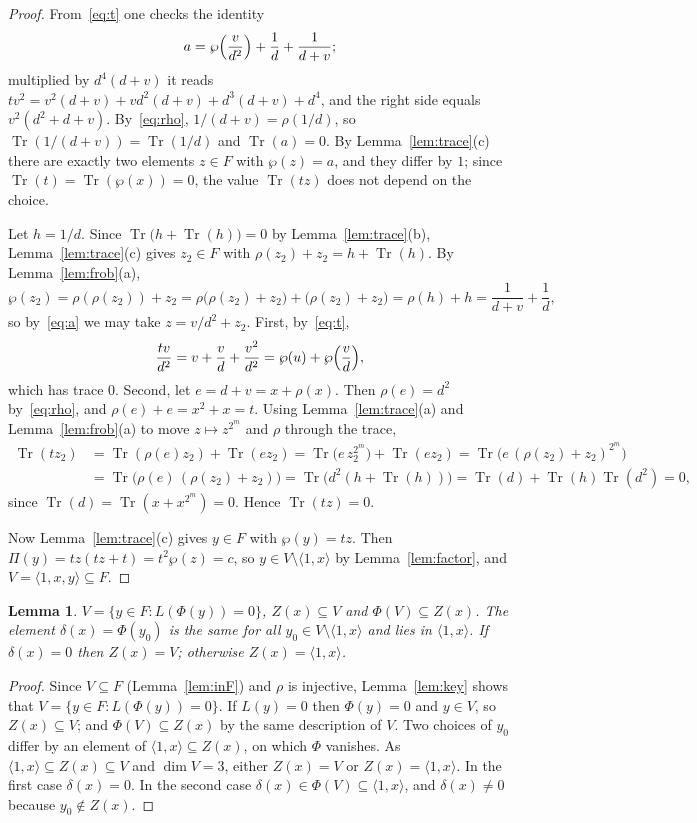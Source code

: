 \documentclass[11pt]{amsart}
\newtheorem{lemma}[theorem]{Lemma}
\theoremstyle{definition}
\theoremstyle{remark}
\numberwithin{equation}{section}
\newcommand{\Tr}{\operatorname{Tr}}
\begin{document}
\begin{proof}
From~\eqref{eq:t} one checks the identity
\begin{equation}\label{eq:a}
a=\wp\Bigl(\frac{v}{d^2}\Bigr)+\frac1d+\frac1{d+v};
\end{equation}
multiplied by $d^4(d+v)$ it reads $tv^2=v^2(d+v)+vd^2(d+v)+d^3(d+v)+d^4$, and the right side equals $v^2(d^2+d+v)$. By~\eqref{eq:rho}, $1/(d+v)=\rho(1/d)$, so $\Tr(1/(d+v))=\Tr(1/d)$ and $\Tr(a)=0$. By Lemma~\ref{lem:trace}(c) there are exactly two elements $z\in F$ with $\wp(z)=a$, and they differ by $1$; since $\Tr(t)=\Tr(\wp(x))=0$, the value $\Tr(tz)$ does not depend on the choice.

Let $h=1/d$. Since $\Tr\bigl(h+\Tr(h)\bigr)=0$ by Lemma~\ref{lem:trace}(b), Lemma~\ref{lem:trace}(c) gives $z_2\in F$ with $\rho(z_2)+z_2=h+\Tr(h)$. By Lemma~\ref{lem:frob}(a),
\[
\wp(z_2)=\rho(\rho(z_2))+z_2=\rho\bigl(\rho(z_2)+z_2\bigr)+\bigl(\rho(z_2)+z_2\bigr)=\rho(h)+h=\frac1{d+v}+\frac1d ,
\]
so by~\eqref{eq:a} we may take $z=v/d^2+z_2$. First, by~\eqref{eq:t},
\[
\frac{tv}{d^2}=v+\frac vd+\frac{v^2}{d^2}=\wp(u)+\wp\Bigl(\frac vd\Bigr),
\]
which has trace $0$. Second, let $e=d+v=x+\rho(x)$. Then $\rho(e)=d^2$ by~\eqref{eq:rho}, and $\rho(e)+e=x^2+x=t$. Using Lemma~\ref{lem:trace}(a) and Lemma~\ref{lem:frob}(a) to move $z\mapsto z^{2^m}$ and $\rho$ through the trace,
\begin{align*}
\Tr(tz_2)&=\Tr(\rho(e)z_2)+\Tr(ez_2)=\Tr\bigl(e\,z_2^{2^m}\bigr)+\Tr(ez_2)=\Tr\bigl(e\,(\rho(z_2)+z_2)^{2^m}\bigr)\\
&=\Tr\bigl(\rho(e)\,(\rho(z_2)+z_2)\bigr)=\Tr\bigl(d^2(h+\Tr(h))\bigr)=\Tr(d)+\Tr(h)\Tr(d^2)=0,
\end{align*}
since $\Tr(d)=\Tr(x+x^{2^m})=0$. Hence $\Tr(tz)=0$.

Now Lemma~\ref{lem:trace}(c) gives $y\in F$ with $\wp(y)=tz$. Then $\Pi(y)=tz(tz+t)=t^2\wp(z)=c$, so $y\in V\setminus\langle1,x\rangle$ by Lemma~\ref{lem:factor}, and $V=\langle1,x,y\rangle\subseteq F$.
\end{proof}

\begin{lemma}\label{lem:delta}
$V=\{y\in F: L(\Phi(y))=0\}$, $Z(x)\subseteq V$ and $\Phi(V)\subseteq Z(x)$. The element $\delta(x)=\Phi(y_0)$ is the same for all $y_0\in V\setminus\langle1,x\rangle$ and lies in $\langle1,x\rangle$. If $\delta(x)=0$ then $Z(x)=V$; otherwise $Z(x)=\langle1,x\rangle$.
\end{lemma}

\begin{proof}
Since $V\subseteq F$ (Lemma~\ref{lem:inF}) and $\rho$ is injective, Lemma~\ref{lem:key} shows that $V=\{y\in F: L(\Phi(y))=0\}$. If $L(y)=0$ then $\Phi(y)=0$ and $y\in V$, so $Z(x)\subseteq V$; and $\Phi(V)\subseteq Z(x)$ by the same description of $V$. Two choices of $y_0$ differ by an element of $\langle1,x\rangle\subseteq Z(x)$, on which $\Phi$ vanishes. As $\langle1,x\rangle\subseteq Z(x)\subseteq V$ and $\dim V=3$, either $Z(x)=V$ or $Z(x)=\langle1,x\rangle$. In the first case $\delta(x)=0$. In the second case $\delta(x)\in\Phi(V)\subseteq\langle1,x\rangle$, and $\delta(x)\ne0$ because $y_0\notin Z(x)$.
\end{proof}
\end{document}
